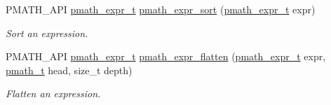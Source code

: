 \begin{CompactItemize}
PMATH\_\-API \hyperlink{classpmath__expr__t}{pmath\_\-expr\_\-t} \hyperlink{group__expressions_gb3708a99c95943b062a91797d340dd7b}{pmath\_\-expr\_\-sort} (\hyperlink{classpmath__expr__t}{pmath\_\-expr\_\-t} expr)
\begin{CompactList}\small\item\em Sort an expression. \item\end{CompactList}\item 
PMATH\_\-API \hyperlink{classpmath__expr__t}{pmath\_\-expr\_\-t} \hyperlink{group__expressions_g9162f7fe8a42627c5adf6185dba9e67d}{pmath\_\-expr\_\-flatten} (\hyperlink{classpmath__expr__t}{pmath\_\-expr\_\-t} expr, \hyperlink{classpmath__t}{pmath\_\-t} head, size\_\-t depth)
\begin{CompactList}\small\item\em Flatten an expression. \item\end{CompactList}\end{CompactItemize}
